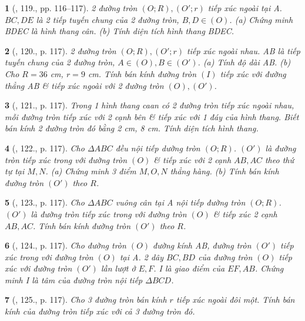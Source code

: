\documentclass{article}
\newtheorem{baitoan}{}
\begin{document}
\begin{baitoan}[\cite{Binh_Toan_9_tap_1}, 119., pp. 116--117]
	2 đường tròn $(O;R),(O';r)$ tiếp xúc ngoài tại A. $BC,DE$ là 2 tiếp tuyến chung của 2 đường tròn, $B,D\in(O)$. (a) Chứng minh BDEC là hình thang cân. (b) Tính diện tích hình thang BDEC.
\end{baitoan}

\begin{baitoan}[\cite{Binh_Toan_9_tap_1}, 120., p. 117]
	2 đường tròn $(O;R),(O';r)$ tiếp xúc ngoài nhau. AB là tiếp tuyến chung của 2 đường tròn, $A\in(O),B\in(O')$. (a) Tính độ dài AB. (b) Cho $R = 36$ {\rm cm}, $r = 9$ {\rm cm}. Tính bán kính đường tròn $(I)$ tiếp xúc với đường thẳng AB \& tiếp xúc ngoài với 2 đường tròn $(O),(O')$.
\end{baitoan}

\begin{baitoan}[\cite{Binh_Toan_9_tap_1}, 121., p. 117]
	Trong 1 hình thang caan có 2 đường tròn tiếp xúc ngoài nhau, mỗi đường tròn tiếp xúc với 2 cạnh bên \& tiếp xúc với 1 đáy của hình thang. Biết bán kính 2 đường tròn đó bằng {\rm2 cm, 8 cm}. Tính diện tích hình thang.
\end{baitoan}

\begin{baitoan}[\cite{Binh_Toan_9_tap_1}, 122., p. 117]
	Cho $\Delta ABC$ đều nội tiếp dường tròn $(O;R)$. $(O')$ là đường tròn tiếp xúc trong với đường tròn $(O)$ \& tiếp xúc với 2 cạnh $AB,AC$ theo thứ tự tại $M,N$. (a) Chứng minh 3 điểm $M,O,N$ thẳng hàng. (b) Tính bán kính đường tròn $(O')$ theo $R$.
\end{baitoan}

\begin{baitoan}[\cite{Binh_Toan_9_tap_1}, 123., p. 117]
	Cho $\Delta ABC$ vuông cân tại A nội tiếp đường tròn $(O;R)$. $(O')$ là đường tròn tiếp xúc trong với đường tròn $(O)$ \& tiếp xúc 2 cạnh $AB,AC$. Tính bán kính đường tròn $(O')$ theo $R$.
\end{baitoan}

\begin{baitoan}[\cite{Binh_Toan_9_tap_1}, 124., p. 117]
	Cho đường tròn $(O)$ đường kính AB, đường tròn $(O')$ tiếp xúc trong với đường tròn $(O)$ tại A. 2 dây $BC,BD$ của đường tròn $(O)$ tiếp xúc với đường tròn $(O')$ lần lượt ở $E,F$. I là giao điểm của $EF,AB$. Chứng minh I là tâm của đường tròn nội tiếp $\Delta BCD$.
\end{baitoan}

\begin{baitoan}[\cite{Binh_Toan_9_tap_1}, 125., p. 117]
	Cho 3 đường tròn bán kính $r$ tiếp xúc ngoài đôi một. Tính bán kính của đường tròn tiếp xúc với cả 3 đường tròn đó.
\end{baitoan}
\end{document}
